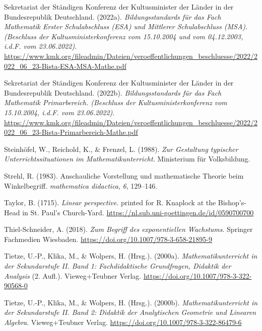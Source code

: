 \documentclass[
]{scrbook}
\newlength{\cslhangindent}
\newenvironment{CSLReferences}[2] %
 {\begin{list}{}{%
  \setlength{\itemindent}{0pt}
  \setlength{\leftmargin}{0pt}
  \setlength{\parsep}{0pt}
  \ifodd #1
   \setlength{\leftmargin}{\cslhangindent}
   \setlength{\itemindent}{-1\cslhangindent}
  \fi
  \setlength{\itemsep}{#2\baselineskip}}}
 {\end{list}}
\theoremstyle{definition}
\theoremstyle{definition}
\theoremstyle{definition}
\theoremstyle{definition}
\theoremstyle{remark}
\begin{document}
\begin{CSLReferences}{1}{0}
Sekretariat der Ständigen Konferenz der Kultusminister der Länder in der Bundesrepublik Deutschland. (2022a). \emph{Bildungsstandards für das {Fach} {Mathematik} {Erster} {Schulabschluss} ({ESA}) und {Mittlerer} {Schulabschluss} ({MSA}). ({Beschluss} der {Kultusministerkonferenz} vom 15.10.2004 und vom 04.12.2003, i.d.{F}. vom 23.06.2022)}. \url{https://www.kmk.org/fileadmin/Dateien/veroeffentlichungen_beschluesse/2022/2022_06_23-Bista-ESA-MSA-Mathe.pdf}

Sekretariat der Ständigen Konferenz der Kultusminister der Länder in der Bundesrepublik Deutschland. (2022b). \emph{Bildungsstandards für das {Fach} {Mathematik} {Primarbereich}. ({Beschluss} der {Kultusministerkonferenz} vom 15.10.2004, i.d.{F}. vom 23.06.2022)}. \url{https://www.kmk.org/fileadmin/Dateien/veroeffentlichungen_beschluesse/2022/2022_06_23-Bista-Primarbereich-Mathe.pdf}

Steinhöfel, W., Reichold, K., \& Frenzel, L. (1988). \emph{Zur {Gestaltung} typischer {Unterrichtssituationen} im {Mathematikunterricht}}. Ministerium für Volksbildung.

Strehl, R. (1983). Anschauliche {Vorstellung} und mathematische {Theorie} beim {Winkelbegriff}. \emph{mathematica didactica}, \emph{6}, 129--146.

Taylor, B. (1715). \emph{Linear perspective}. printed for R. Knaplock at the Bishop's-Head in St. Paul's Church-Yard. \url{https://nl.sub.uni-goettingen.de/id/0590700700}

Thiel-Schneider, A. (2018). \emph{Zum {Begriff} des exponentiellen {Wachstums}}. Springer Fachmedien Wiesbaden. \url{https://doi.org/10.1007/978-3-658-21895-9}

Tietze, U.-P., Klika, M., \& Wolpers, H. (Hrsg.). (2000a). \emph{Mathematikunterricht in der {Sekundarstufe} {II}. {Band} 1: {Fachdidaktische} {Grundfragen}, {Didaktik} der {Analysis}} (2. Aufl.). Vieweg+Teubner Verlag. \url{https://doi.org/10.1007/978-3-322-90568-0}

Tietze, U.-P., Klika, M., \& Wolpers, H. (Hrsg.). (2000b). \emph{Mathematikunterricht in der {Sekundarstufe} {II}. {Band} 2: {Didaktik} der {Analytischen} {Geometrie} und {Linearen} {Algebra}}. Vieweg+Teubner Verlag. \url{https://doi.org/10.1007/978-3-322-86479-6}


\end{CSLReferences}
\end{document}

